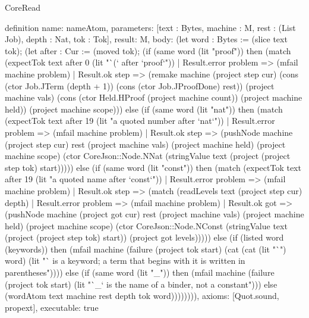 \begin{lexlean}{CoreRead}
\begin{semanticmodule}
definition{
  name: nameAtom,
  parameters: [text : Bytes, machine : M, rest : (List Job), depth : Nat, tok : Tok],
  result: M,
  body: (let word : Bytes := (slice text tok); (let after : Cur := (moved tok); (if (same word (lit "proof")) then (match (expectTok text after 0 (lit "`(` after `proof`"))
    | Result.error problem => (mfail machine problem)
    | Result.ok step => (remake machine (project step cur) (cons (ctor Job.JTerm (depth + 1)) (cons (ctor Job.JProofDone) rest)) (project machine vals) (cons (ctor Held.HProof (project machine count)) (project machine held)) (project machine scope))) else (if (same word (lit "nat")) then (match (expectTok text after 19 (lit "a quoted number after `nat`"))
    | Result.error problem => (mfail machine problem)
    | Result.ok step => (pushNode machine (project step cur) rest (project machine vals) (project machine held) (project machine scope) (ctor CoreJson::Node.NNat (stringValue text (project (project step tok) start))))) else (if (same word (lit "const")) then (match (expectTok text after 19 (lit "a quoted name after `const`"))
    | Result.error problem => (mfail machine problem)
    | Result.ok step => (match (readLevels text (project step cur) depth)
      | Result.error problem => (mfail machine problem)
      | Result.ok got => (pushNode machine (project got cur) rest (project machine vals) (project machine held) (project machine scope) (ctor CoreJson::Node.NConst (stringValue text (project (project step tok) start)) (project got levels))))) else (if (listed word (keywords)) then (mfail machine (failure (project tok start) (cat (cat (lit "`") word) (lit "` is a keyword; a term that begins with it is written in parentheses")))) else (if (same word (lit "_")) then (mfail machine (failure (project tok start) (lit "`_` is the name of a binder, not a constant"))) else (wordAtom text machine rest depth tok word)))))))),
  axioms: [Quot.sound, propext],
  executable: true
}


\end{semanticmodule}
\end{lexlean}
